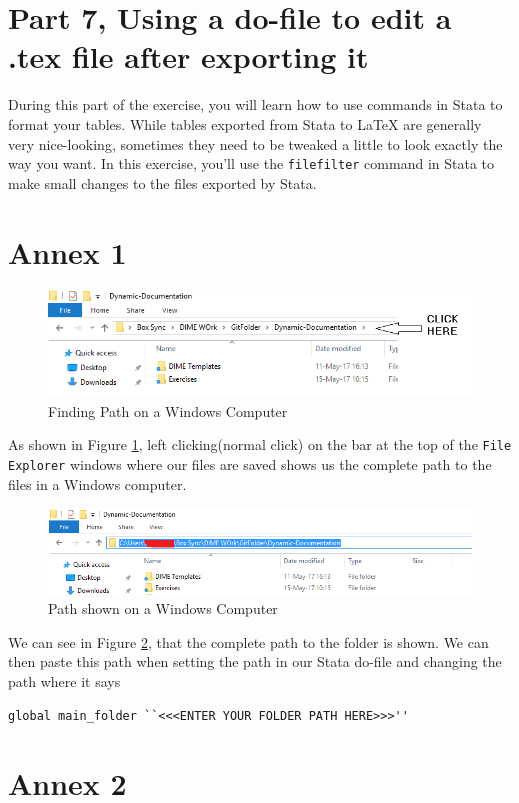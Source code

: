 \documentclass[]{article}
\begin{document}
\section*{Part 7, Using a do-file to edit a .tex file after exporting it}
During this part of the exercise, you will learn how to use commands in Stata to format your tables. While tables exported from Stata to {\LaTeX} are generally very nice-looking, sometimes they need to be tweaked a little to look exactly the way you want. In this exercise, you'll use the \texttt{filefilter} command in Stata to make small changes to the files exported by Stata. 

\newpage
\section*{Annex 1} {\label{annex1}}

\begin{figure}[H]
	\centering
	\includegraphics[width=1\linewidth]{img/pathwin}
	\caption{Finding Path on a Windows Computer}
	\label{fig:pathwin}
\end{figure}
As shown in Figure \ref{fig:pathwin}, left clicking(normal click) on the bar at the top of the \texttt{File Explorer} windows where our files are saved shows us the complete path to the files in a Windows computer. \\

\begin{figure}[H]
	\centering
	\includegraphics[width=1\linewidth]{img/pathwin2}
	\caption{Path shown on a Windows Computer}
	\label{fig:pathwin2}
\end{figure}

We can see in Figure \ref{fig:pathwin2}, that the complete path to the folder is shown. We can then paste this path when setting the path in our Stata do-file and changing the path where it says \begin{verbatim}
global main_folder ``<<<ENTER YOUR FOLDER PATH HERE>>>''
\end{verbatim} 

\section*{Annex 2} {\label{annex2}}
	
\end{document}
